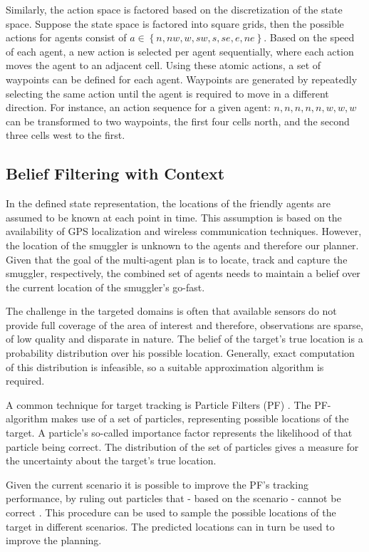 \documentclass[conference]{IEEEtran}
\begin{document}
Similarly, the action space is factored based on the discretization of the state space. Suppose the state space is factored into square grids, then the possible actions for agents consist of $a\in\left\{n, nw, w, sw, s, se, e, ne\right\}$. Based on the speed of each agent, a new action is selected per agent sequentially, where each action moves the agent to an adjacent cell. Using these atomic actions, a set of waypoints can be defined for each agent. Waypoints are generated by repeatedly selecting the same action until the agent is required to move in a different direction. For instance, an action sequence for a given agent: $n, n, n, n, n, w, w, w$ can be transformed to two waypoints, the first four cells north, and the second three cells west to the first.

\subsection{Belief Filtering with Context}
\label{subsec:belief-filter}

In the defined state representation, the locations of the friendly agents are assumed to be known at each point in time. This assumption is based on the availability of GPS localization and wireless communication techniques. However, the location of the smuggler is unknown to the agents and therefore our planner. Given that the goal of the multi-agent plan is to locate, track and capture the smuggler, respectively, the combined set of agents needs to maintain a belief over the current location of the smuggler's go-fast.

The challenge in the targeted domains is often that available sensors do not provide full coverage of the area of interest and therefore, observations are sparse, of low quality and disparate in nature. The belief of the target's true location is a probability distribution over his possible location. Generally, exact computation of this distribution is infeasible, so a suitable approximation algorithm is required.

A common technique for target tracking is Particle Filters (PF) \cite{Blackman1999}. The PF-algorithm makes use of a set of particles, representing possible locations of the target. A particle's so-called importance factor represents the likelihood of that particle being correct. The distribution of the set of particles gives a measure for the uncertainty about the target's true location.

Given the current scenario it is possible to improve the PF's tracking performance, by ruling out particles that - based on the scenario - cannot be correct \cite{deOude2014}. This procedure can be used to sample the possible locations of the target in different scenarios. The predicted locations can in turn be used to improve the planning.
\end{document}

